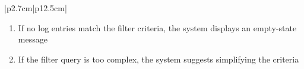 \begin{table}[H]
\begin{tabular}{|p{2.7cm}|p{12.5cm}|}
\begin{minipage}[t]{\linewidth}
                                      \begin{enumerate}[topsep=0pt,itemsep=1pt,parsep=0pt,partopsep=0pt]
                                          \item If no log entries match the filter criteria, the system displays an empty-state
                                                message
                                          \item If the filter query is too complex, the system suggests simplifying the
                                                criteria
                                      \end{enumerate}
                                  \end{minipage}         \\ \hline
    \end{tabular}
    \label{tab:admin-filter-logs}
\end{table}


